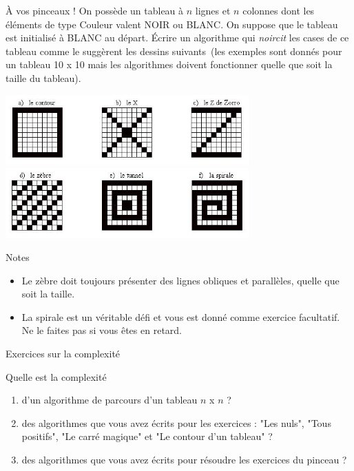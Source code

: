 	\begin{Exercice}{À vos pinceaux !}
		On possède un tableau à $n$ lignes et $n$ colonnes dont les éléments de type
		Couleur valent NOIR ou BLANC. On suppose que le tableau est initialisé
		à BLANC au départ. Écrire un algorithme qui \emph{noircit} les cases de ce
		tableau comme le suggèrent les dessins suivants~(les exemples sont
		donnés pour un tableau 10 x 10 mais les algorithmes doivent fonctionner
		quelle que soit la taille du tableau).
		
		\begin{center}
		\includegraphics[width=0.7\textwidth]{image/tab2d-ex-oxz}
		\includegraphics[width=0.7\textwidth]{image/tab2d-ex-zts}
		\end{center}
		
		Notes
		\begin{itemize}
		\item 
			Le zèbre doit toujours présenter des lignes
			obliques et parallèles, quelle que soit la taille.
		\item
			La spirale est un véritable défi
			et vous est donné comme exercice facultatif.
			Ne le faites pas si vous êtes en retard.
		\end{itemize}
		
	\end{Exercice}
	
	\begin{Exercice}{Exercices sur la complexité}
	
		Quelle est la complexité 
		\begin{enumerate}[label=\alph*)]
		\item 
			d’un algorithme de parcours	d'un tableau $n$ x $n$ ?
		\item
			des algorithmes que vous avez écrits pour les exercices :
			"Les nuls", "Tous positifs", "Le carré magique"
			et "Le contour d'un tableau" ?
		\item 
			des algorithmes que vous avez écrits pour résoudre les
			exercices du pinceau ?
		\end{enumerate}
	\end{Exercice}

